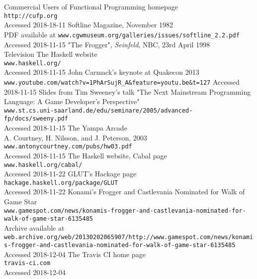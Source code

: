 \documentclass[12pt, a4paper]{report}
\begin{document}
\begin{thebibliography}{0}
    Commercial Users of Functional Programming homepage\\
    \verb|http://cufp.org|\\
    Accessed 2018-18-11
    Softline Magazine, November 1982\\
    PDF available at \verb|www.cgwmuseum.org/galleries/issues/softline_2.2.pdf|\\
    Accessed 2018-11-15
    "The Frogger", \textit{Seinfeld}, NBC, 23rd April 1998\\
    Television
    The Haskell website\\
    \verb|www.haskell.org/|\\
    Accessed 2018-11-15
    John Carmack's keynote at Quakecon 2013\\
    \verb|www.youtube.com/watch?v=1PhArSujR_A&feature=youtu.be&t=127|
    Accessed 2018-11-15
    Slides from Tim Sweeney's talk "The Next Mainstream Programming Language: A Game Developer’s Perspective"\\
    \verb|www.st.cs.uni-saarland.de/edu/seminare/2005/advanced-fp/docs/sweeny.pdf|\\
    Accessed 2018-11-15
    The Yampa Arcade\\
    A. Courtney, H. Nilsson, and J. Peterson, 2003\\
    \verb|www.antonycourtney.com/pubs/hw03.pdf|\\
    Accessed 2018-11-15
    The Haskell website, Cabal page\\
    \verb|www.haskell.org/cabal/|\\
    Accessed 2018-11-22
    GLUT's Hackage page\\
    \verb|hackage.haskell.org/package/GLUT|\\
    Accessed 2018-11-22
    Konami's Frogger and Castlevania Nominated for Walk of Game Star\\
    \verb|www.gamespot.com/news/konamis-frogger-and-castlevania-nominated-for-walk-of-game-star-6135485|\\
    Archive available at \verb|web.archive.org/web/20130202065907/http://www.gamespot.com/news/konamis-frogger-and-castlevania-nominated-for-walk-of-game-star-6135485|\\
    Accessed 2018-12-04
    The Travis CI home page\\
    \verb|travis-ci.com|\\
    Accessed 2018-12-04
\end{thebibliography}
\end{document}
